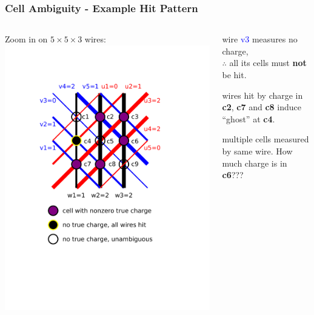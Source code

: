 \begin{frame}
  \frametitle{Cell Ambiguity - Example Hit Pattern}

  \begin{columns}
    \begin{column}{0.35\textwidth}
      \begin{center}
        \scriptsize Zoom in on $5 \times 5 \times 3$ wires:
        \includegraphics[width=\textwidth,trim=3.5cm 6cm 5cm 3cm,clip]{example-hit-cells.pdf}        
      \end{center}
    \end{column}
    \begin{column}{0.65\textwidth}
      \begin{description}\footnotesize
      \item[Good] wire \textcolor{blue}{v3} measures no charge, \\$\therefore$ all its cells must \textbf{not} be hit.
      \item[Bad] wires hit by charge in \textbf{c2}, \textbf{c7} and \textbf{c8} induce ``ghost'' at \textbf{c4}.
      \item[Ambiguous] multiple cells measured by same wire.
        How much charge is in \textbf{c6}???
      \end{description}

      \vspace{6mm}

    \end{column}
  \end{columns}
\end{frame}


